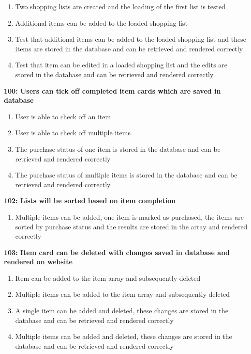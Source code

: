 \documentclass[10pt,onecolumn]{witseiepaper}
\begin{document}
\begin{enumerate}
	\item Two shopping lists are created and the loading of the first list is tested
	\item Additional items can be added to the loaded shopping list
	\item Test that additional items can be added to the loaded shopping list and these items are stored in the database and can be retrieved and rendered correctly
	\item Test that item can be edited in a loaded shopping list and the edits are stored in the database and can be retrieved and rendered correctly
\end{enumerate}

\textbf{100: Users can tick off completed item cards which are saved in database}

\begin{enumerate}
	\item User is able to check off an item
	\item User is able to check off multiple items 
	\item The purchase status of one item is stored in the database and can be retrieved and rendered correctly 
	\item The purchase status of multiple items is stored in the database and can be retrieved and rendered correctly
\end{enumerate}

\textbf{102: Lists will be sorted based on item completion}

\begin{enumerate}
	\item Multiple items can be added, one item is marked as purchased, the items are sorted by purchase status and the results are stored in the array and rendered correctly
\end{enumerate}

\textbf{103: Item card can be deleted with changes saved in database and rendered on website}

\begin{enumerate}
	\item Item can be added to the item array and subsequently deleted
	\item Multiple items can be added to the item array and subsequently deleted
	\item A single item can be added and deleted, these changes are stored in the database and can be retrieved and rendered correctly
	\item Multiple items can be added and deleted, these changes are stored in the database and can be retrieved and rendered correctly
\end{enumerate}
\end{document}
